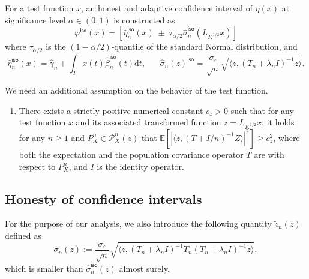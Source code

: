 \documentclass[aos]{imsart}
\renewcommand{\hat}{\widehat}
\renewcommand{\tilde}{\widetilde}
\newcommand{\supp}{\mathrm{supp}}
\newcommand{\mX}{\mathcal X}
\newcommand{\ud}{\mathrm d}
\newcommand{\iso}{\mathsf{iso}}
\theoremstyle{plain}
\theoremstyle{definition}
\theoremstyle{definition}
\begin{document}
For a test function $x$, an honest and adaptive confidence interval of $\eta(x)$ at significance level $\alpha\in(0,1)$ is constructed as
$$
\varphi^\iso(x) = [\hat\eta_n^\iso(x)\;\pm\;\tau_{\alpha/2}\hat\sigma_n^\iso(L_{K^{1/2}}x)]
$$
where $\tau_{\alpha/2}$ is the $(1-\alpha/2)$-quantile of the standard Normal distribution, and
$$
\hat\eta_n^\iso(x) = \hat\gamma_n + \int_I x(t)\hat\beta_n^\iso(t)\ud t,\;\;\;\;\;\;\hat\sigma_n(z)^\iso = \frac{\sigma_\varepsilon}{\sqrt{n}}\sqrt{\langle z, (T_n+\lambda_n I)^{-1}z\rangle}.
$$

{\color{cyan}
We need an additional assumption on the behavior of the test function.
\begin{enumerate}
    \item[(B4)] There exists a strictly positive numerical constant $c_z>0$ such that for any test function $x$ and its associated transformed function $z=L_{K^{1/2}}x$, it holds for any $n\geq 1$ and $P_X^n\in\mathcal P_X^n(z)$ that $\mathbb E[|\langle z, (T+I/n)^{-1} Z\rangle|^2]\geq c_z^2$, where both the expectation and the population covariance operator $T$ are with respect to $P_X^n$, and $I$ is the identity operator.
\end{enumerate}
}

\subsection{Honesty of confidence intervals}

For the purpose of our analysis, 
we also introduce the following quantity $\tilde z_n(z)$ defined as
$$
\tilde\sigma_n(z) := \frac{\sigma_\varepsilon}{\sqrt{n}}\sqrt{\langle z, (T_n+\lambda_n I)^{-1}T_n(T_n+\lambda_n I)^{-1}z\rangle},
$$
which is smaller than $\hat\sigma_n^\iso(z)$ almost surely.

\end{document}
